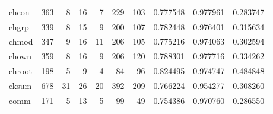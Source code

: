 \begin{longtable}{lrrrrrrrrr}
chcon     &                    363 &                                  8 &                                16 &                                7 &                               229 &                             103 &                                0.777548 &                               0.977961 &                             0.283747 \\
chgrp     &                    339 &                                  8 &                                15 &                                9 &                               200 &                             107 &                                0.782448 &                               0.976401 &                             0.315634 \\
chmod     &                    347 &                                  9 &                                16 &                               11 &                               206 &                             105 &                                0.775216 &                               0.974063 &                             0.302594 \\
chown     &                    359 &                                  8 &                                16 &                                9 &                               206 &                             120 &                                0.788301 &                               0.977716 &                             0.334262 \\
chroot    &                    198 &                                  5 &                                 9 &                                4 &                                84 &                              96 &                                0.824495 &                               0.974747 &                             0.484848 \\
cksum     &                    678 &                                 31 &                                26 &                               20 &                               392 &                             209 &                                0.766224 &                               0.954277 &                             0.308260 \\
comm      &                    171 &                                  5 &                                13 &                                5 &                                99 &                              49 &                                0.754386 &                               0.970760 &                             0.286550 \\

\end{longtable}
